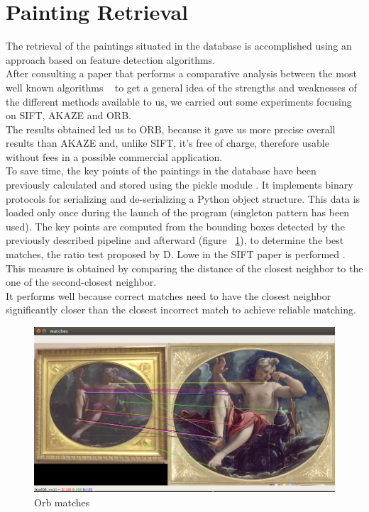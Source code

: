 \documentclass[conference]{IEEEtran}
\begin{document}
\section{Painting Retrieval}
The retrieval of the paintings situated in the database is accomplished using an approach based on feature detection algorithms.\\ 
After consulting a paper that performs a comparative analysis between the most well known algorithms ~\cite{b7} to get a general idea of the strengths and weaknesses of the different methods available to us, we carried out some experiments focusing on SIFT, AKAZE and ORB.\\
The results obtained led us to ORB, because it gave us more precise overall results than AKAZE and, unlike SIFT, it’s free of charge, therefore usable without fees in a possible commercial application.\\
To save time, the key points of the paintings in the database have been previously calculated and stored using the pickle module \cite{b8}.
It implements binary protocols for serializing and de-serializing a Python object structure.
This data is loaded only once during the launch of the program (singleton pattern has been used).
The key points are computed from the bounding boxes detected by the previously described pipeline and afterward (figure ~\ref{fig_Orb_matches}), to determine the best matches, the ratio test proposed by D. Lowe in the SIFT paper is performed \cite{b9}.\\
This measure is obtained by comparing the distance of the closest neighbor to the one of the second-closest neighbor.\\
It performs well because correct matches need to have the closest neighbor significantly closer than the closest incorrect match to achieve reliable matching.\\

\begin{figure}[htbp]
\centerline{\includegraphics[width=0.8\columnwidth]{../Orb_matches/match3.png}}
\caption{Orb matches}
\label{fig_Orb_matches}
\end{figure}
\bigskip
\end{document}
